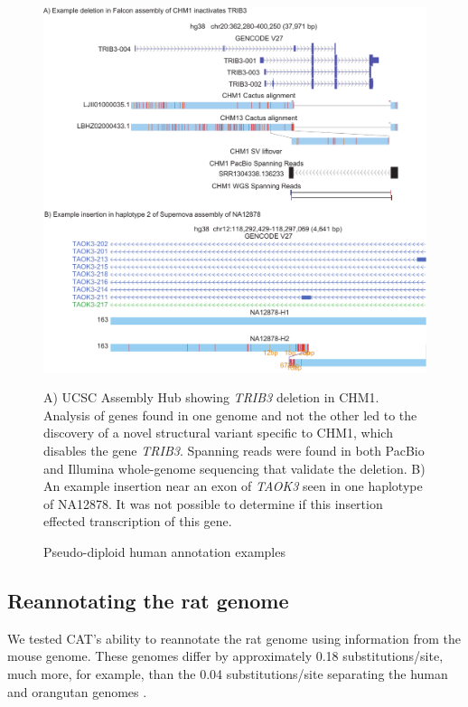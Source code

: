 \documentclass[fleqn,10pt]{wlscirep}
\begin{document}
\begin{figure}
\centering
\includegraphics[width=\textwidth,height=0.75\textheight,keepaspectratio]{human-examples.pdf}
\caption{Pseudo-diploid human annotation examples}
A) UCSC Assembly Hub \citep{nguyen2014comparative} showing \textit{TRIB3} deletion in CHM1. Analysis of genes found in one genome and not the other led to the discovery of a novel structural variant specific to CHM1, which disables the gene \textit{TRIB3}. Spanning reads were found in both PacBio and Illumina whole-genome sequencing that validate the deletion. B) An example insertion near an exon of \textit{TAOK3} seen in one haplotype of NA12878. It was not possible to determine if this insertion effected transcription of this gene.
\label{fig:human_example}
\end{figure}

\subsection*{Reannotating the rat genome}

We tested CAT's ability to reannotate the rat genome using information from the mouse genome. These genomes differ by approximately 0.18 substitutions/site, much more, for example, than the 0.04 substitutions/site separating the human and orangutan genomes \citep{karolchik2003ucsc}.
\end{document}
